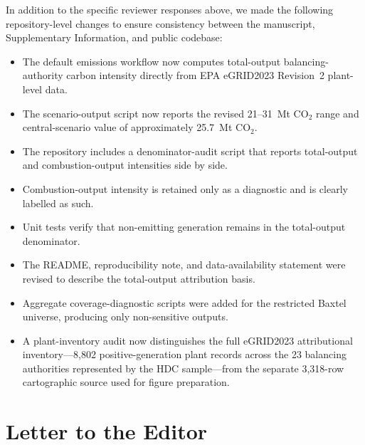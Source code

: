 \documentclass[11pt]{article}
\begin{document}
In addition to the specific reviewer responses above, we made the following repository-level changes to ensure consistency between the manuscript, Supplementary Information, and public codebase:

\begin{itemize}
    \item The default emissions workflow now computes total-output balancing-authority carbon intensity directly from EPA eGRID2023 Revision~2 plant-level data.
    \item The scenario-output script now reports the revised 21--31~Mt CO$_2$ range and central-scenario value of approximately 25.7~Mt CO$_2$.
    \item The repository includes a denominator-audit script that reports total-output and combustion-output intensities side by side.
    \item Combustion-output intensity is retained only as a diagnostic and is clearly labelled as such.
    \item Unit tests verify that non-emitting generation remains in the total-output denominator.
    \item The README, reproducibility note, and data-availability statement were revised to describe the total-output attribution basis.
    \item Aggregate coverage-diagnostic scripts were added for the restricted Baxtel universe, producing only non-sensitive outputs.
\item A plant-inventory audit now distinguishes the full eGRID2023 attributional inventory---8,802 positive-generation plant records across the 23 balancing authorities represented by the HDC sample---from the separate 3,318-row cartographic source used for figure preparation.
\end{itemize}

\bigskip

\section*{Letter to the Editor}
\end{document}
